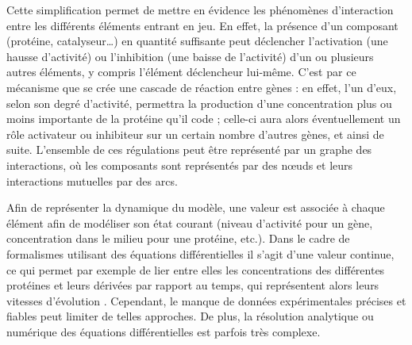 Cette simplification permet de mettre en évidence les phénomènes d'interaction entre
les différents éléments entrant en jeu.
En effet, la présence d'un composant (protéine, catalyseur…)
en quantité suffisante peut déclencher
l'activation (une hausse d'activité) ou l'inhibition (une baisse de l'activité)
d'un ou plusieurs autres éléments, y compris l'élément déclencheur lui-même.
C'est par ce mécanisme que se crée une cascade de réaction entre gènes :
en effet, l'un d'eux, selon son degré d'activité,
permettra la production d'une concentration plus ou moins importante de la protéine qu'il code ;
celle-ci aura alors éventuellement un rôle activateur ou inhibiteur sur un certain
nombre d'autres gènes, et ainsi de suite.
L'ensemble de ces régulations peut être représenté par un graphe des interactions,
où les composants sont représentés par des nœuds et leurs interactions mutuelles par des arcs.


Afin de représenter la dynamique du modèle,
une valeur est associée à chaque élément afin de modéliser
son état courant
(niveau d'activité pour un gène,
concentration dans le milieu pour une protéine, etc.).
Dans le cadre de formalismes utilisant des équations différentielles
il s'agit d'une valeur continue,
ce qui permet par exemple de lier entre elles
les concentrations des différentes protéines et leurs dérivées par rapport au temps,
qui représentent alors leurs vitesses d'évolution \cite{tyson1978dynamics}.
Cependant, le manque de données expérimentales précises et fiables peut limiter de telles
approches.
De plus, la résolution analytique ou numérique des équations différentielles est parfois
très complexe.

